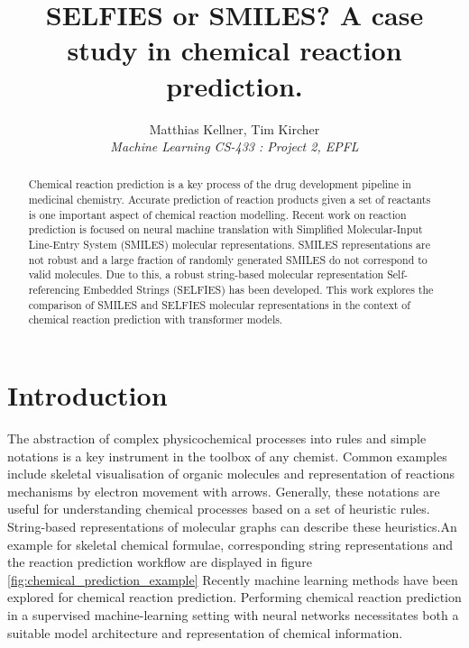 \documentclass[10pt,conference,compsocconf]{IEEEtran}
\begin{document}
\title{SELFIES or SMILES? A case study in chemical reaction prediction.}

\author{
  Matthias Kellner, Tim Kircher\\
  \textit{Machine Learning CS-433 : Project 2, EPFL}
}

\maketitle

\begin{abstract}
    Chemical reaction prediction is a key process of the drug development pipeline in medicinal chemistry. Accurate prediction of reaction products given a set of reactants is one important aspect of chemical reaction modelling. Recent work on reaction prediction is focused on neural machine translation with Simplified Molecular-Input Line-Entry System (SMILES) molecular representations. SMILES representations are not robust and a large fraction of randomly generated SMILES do not correspond to valid molecules. Due to this, a robust string-based molecular representation Self-referencing Embedded Strings (SELFIES) has been developed. This work explores the comparison of SMILES and SELFIES molecular representations in the context of chemical reaction prediction with transformer models.
\end{abstract}

\section{Introduction}

The abstraction of complex physicochemical processes into rules and simple notations is a key instrument in the toolbox of any chemist. Common examples include skeletal visualisation of organic molecules and representation of reactions mechanisms by electron movement with arrows. Generally, these notations are useful for understanding chemical processes based on a set of heuristic rules. String-based representations of molecular graphs can describe these heuristics.An example for skeletal chemical formulae, corresponding string representations and the reaction prediction workflow are displayed in figure \ref{fig:chemical_prediction_example}
Recently machine learning methods have been explored for chemical reaction prediction.\cite{ReactionPredictionReview,MolecularTransformer} Performing chemical reaction prediction in a supervised machine-learning setting with neural networks necessitates both a suitable model architecture and representation of chemical information. 
\end{document}
